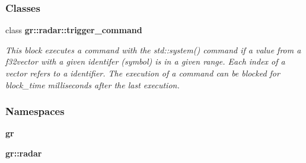 \subsubsection*{Classes}
\begin{DoxyCompactItemize}
\item 
class {\bf gr\+::radar\+::trigger\+\_\+command}
\begin{DoxyCompactList}\small\item\em This block executes a command with the std\+::system() command if a value from a f32vector with a given identifer (symbol) is in a given range. Each index of a vector refers to a identifier. The execution of a command can be blocked for block\+\_\+time milliseconds after the last execution. \end{DoxyCompactList}\end{DoxyCompactItemize}
\subsubsection*{Namespaces}
\begin{DoxyCompactItemize}
\item 
 {\bf gr}
\item 
 {\bf gr\+::radar}
\end{DoxyCompactItemize}
